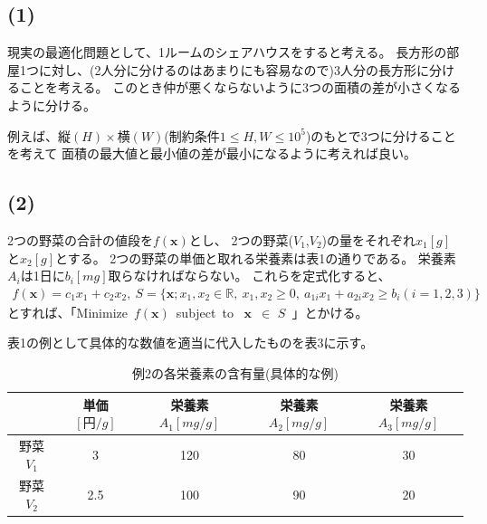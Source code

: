 \documentclass[12pt]{jarticle}
\begin{document}
\subsection*{(1)}
現実の最適化問題として、1ルームのシェアハウスをすると考える。
長方形の部屋1つに対し、(2人分に分けるのはあまりにも容易なので)3人分の長方形に分けることを考える。
このとき仲が悪くならないように3つの面積の差が小さくなるように分ける。

例えば、$縦(H)\times 横(W)$(制約条件$1\leq H,W \leq 10^5$)のもとで3つに分けることを考えて
面積の最大値と最小値の差が最小になるように考えれば良い。

\clearpage
\subsection*{(2)}
2つの野菜の合計の値段を$f(\boldsymbol{x})$とし、
2つの野菜($V_1$,$V_2$)の量をそれぞれ$x_1[g]$と$x_2[g]$とする。
2つの野菜の単価と取れる栄養素は表1の通りである。
栄養素$A_i$は1日に$b_i[mg]$取らなければならない。
これらを定式化すると、
\begin{eqnarray}
    f(\boldsymbol{x})=c_1 x_1 +c_2 x_2,\ S=\{\boldsymbol{x};x_1,x_2\in \mathbb{R},\ x_1,x_2\geq 0,\ a_{1i} x_1+a_{2i}x_2\geq b_i(i=1,2,3)\}\nonumber
\end{eqnarray}
とすれば、「Minimize\ $f(\boldsymbol{x})$\ subject\ to \ $\boldsymbol{x}$\ $\in$ $S$\ 」とかける。

表1の例として具体的な数値を適当に代入したものを表3に示す。
\begin{table}[htb]
    \begin{center}
        \caption{例2の各栄養素の含有量(具体的な例)}
        \begin{tabular}{|c|c|c|c|c|}
            \hline
                      & 単価$[円/g]$ & 栄養素$A_1[mg/g]$ & 栄養素$A_2[mg/g]$ & 栄養素$A_3[mg/g]$ \\
            \hline
            野菜$V_1$ & 3            & 120               & 80                & 30                \\
            野菜$V_2$ & 2.5          & 100               & 90                & 20                \\
            \hline
        \end{tabular}
    \end{center}
\end{table}
\end{document}
